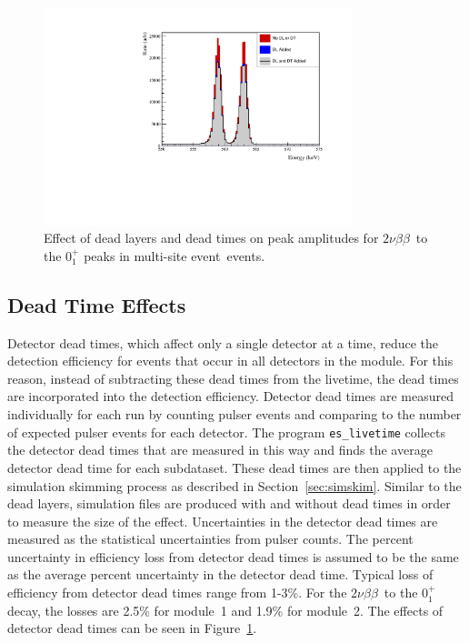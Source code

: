 \documentclass[notitlepage,rmp,aps,10pt]{revtex4-1}
\newcommand{\tnbb}{${2 \nu \beta \beta}$}
\newcommand{\SP}[3]{$#1^{#2}_{#3}$}
\newcommand{\msmd}{multi-site event}
\begin{document}
\begin{figure}
  \centering
  \includegraphics[width=0.8\textwidth]{DeadLayerDeadTime}
  \caption[Simulated effect of dead layers and dead times]{\label{fig:dldt}
    Effect of dead layers and dead times on peak amplitudes for \tnbb\ to the \SP{0}{+}{1} peaks in \msmd\ events.
  }
\end{figure}

\subsection{Dead Time Effects} \label{sec:DT}
Detector dead times, which affect only a single detector at a time, reduce the detection efficiency for events that occur in all detectors in the module.
For this reason, instead of subtracting these dead times from the livetime, the dead times are incorporated into the detection efficiency.
Detector dead times are measured individually for each run by counting pulser events and comparing to the number of expected pulser events for each detector.
The program \texttt{es\_livetime} collects the detector dead times that are measured in this way and finds the average detector dead time for each subdataset.
These dead times are then applied to the simulation skimming process as described in Section~\ref{sec:simskim}.
Similar to the dead layers, simulation files are produced with and without dead times in order to measure the size of the effect.
Uncertainties in the detector dead times are measured as the statistical uncertainties from pulser counts.
The percent uncertainty in efficiency loss from detector dead times is assumed to be the same as the average percent uncertainty in the detector dead time.
Typical loss of efficiency from detector dead times range from 1-3\%.
For the \tnbb\ to the \SP{0}{+}{1} decay, the losses are 2.5\% for module~1 and 1.9\% for module~2.
The effects of detector dead times can be seen in Figure~\ref{fig:dldt}.
\end{document}
